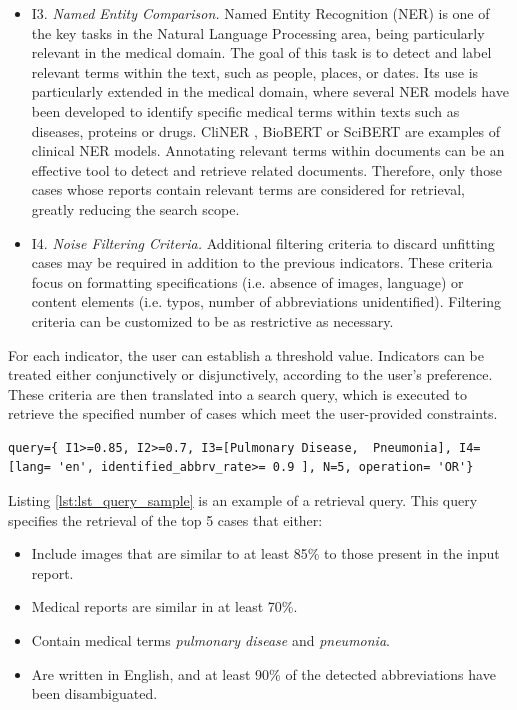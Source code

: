 \begin{itemize}
    \item I3. \textit{Named Entity Comparison.} Named Entity Recognition (NER) is one of the key tasks in the Natural Language Processing area, being particularly relevant in the medical domain. The goal of this task is to detect and label relevant terms within the text, such as people, places, or dates. Its use is particularly extended in the medical domain, where several NER models have been developed to identify specific medical terms within texts such as diseases, proteins or drugs. CliNER \cite{cliner}, BioBERT \citep{biobert} or SciBERT \citep{scibert} are examples of clinical NER models. Annotating relevant terms within documents can be an effective tool to detect and retrieve related documents. Therefore, only those cases whose reports contain relevant terms are considered for retrieval, greatly reducing the search scope.
    
    \item I4. \textit{Noise Filtering Criteria.} Additional filtering criteria to discard unfitting cases may be required in addition to the previous indicators. These criteria focus on formatting specifications (i.e. absence of images, language) or content elements (i.e. typos, number of abbreviations unidentified). Filtering criteria can be customized to be as restrictive as necessary. 
\end{itemize}

For each indicator, the user can establish a threshold value. Indicators can be treated either conjunctively or disjunctively, according to the user's preference. These criteria are then translated into a search query, which is executed to retrieve the specified number of cases which meet the user-provided constraints.

\begin{lstlisting}[captionpos=b, breaklines=true, float=tp,floatplacement=tbp, caption=Example of a retrieval query., label=lst:lst_query_sample,basicstyle=\ttfamily,frame=single]
   query={ I1>=0.85, I2>=0.7, I3=[Pulmonary Disease,  Pneumonia], I4=[lang= 'en', identified_abbrv_rate>= 0.9 ], N=5, operation= 'OR'}
\end{lstlisting}

Listing \ref{lst:lst_query_sample} is an example of a retrieval query. This query specifies the retrieval of the top 5 cases that either:
\begin{itemize}
    \item Include images that are similar to at least 85\% to those present in the input report.
    \item Medical reports are similar in at least 70\%.
    \item Contain medical terms \textit{pulmonary disease} and \textit{pneumonia}.
    \item Are written in English, and at least 90\% of the detected abbreviations have been disambiguated.
\end{itemize}

